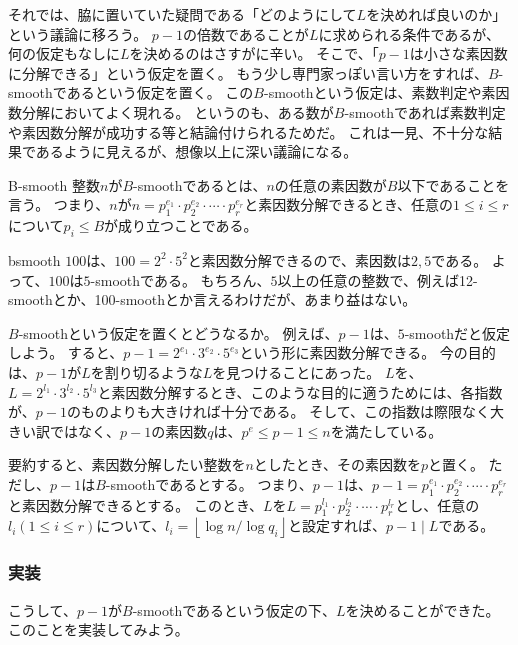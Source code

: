 それでは、脇に置いていた疑問である「どのようにして$L$を決めれば良いのか」という議論に移ろう。
$p-1$の倍数であることが$L$に求められる条件であるが、何の仮定もなしに$L$を決めるのはさすがに辛い。
そこで、「$p-1$は小さな素因数に分解できる」という仮定を置く。
もう少し専門家っぽい言い方をすれば、$B$-smoothであるという仮定を置く。
この$B$-smoothという仮定は、素数判定や素因数分解においてよく現れる。
というのも、ある数が$B$-smoothであれば素数判定や素因数分解が成功する等と結論付けられるためだ。
これは一見、不十分な結果であるように見えるが、想像以上に深い議論になる。

\begin{Defi}{}{B-smooth}
整数$n$が$B$-smoothであるとは、$n$の任意の素因数が$B$以下であることを言う。
つまり、$n$が$n=p_1^{e_1}\cdot p_2^{e_2}\cdot\cdots\cdot p_r^{e_r}$と素因数分解できるとき、任意の$1\le i\le r$について$p_i \le B$が成り立つことである。
\end{Defi}

\begin{Exam}{}{bsmooth}
$100$は、$100=2^2\cdot5^2$と素因数分解できるので、素因数は$2,5$である。
よって、$100$は$5$-smoothである。
もちろん、$5$以上の任意の整数で、例えば12-smoothとか、100-smoothとか言えるわけだが、あまり益はない。
\end{Exam}

$B$-smoothという仮定を置くとどうなるか。
例えば、$p-1$は、$5$-smoothだと仮定しよう。
すると、$p-1=2^{e_1}\cdot3^{e_2}\cdot5^{e_3}$という形に素因数分解できる。
今の目的は、$p-1$が$L$を割り切るような$L$を見つけることにあった。
$L$を、$L=2^{l_1}\cdot3^{l_2}\cdot5^{l_3}$と素因数分解するとき、このような目的に適うためには、各指数が、$p-1$のものよりも大きければ十分である。
そして、この指数は際限なく大きい訳ではなく、$p-1$の素因数$q$は、$p^e\le p-1\le n$を満たしている。

要約すると、素因数分解したい整数を$n$としたとき、その素因数を$p$と置く。
ただし、$p-1$は$B$-smoothであるとする。
つまり、$p-1$は、$p-1=p_1^{e_1}\cdot p_2^{e_2}\cdot\cdots\cdot p_r^{e_r}$と素因数分解できるとする。
このとき、$L$を$L=p_1^{l_1}\cdot p_2^{l_2}\cdot\cdots\cdot p_r^{l_r}$とし、任意の$l_i(1\le i\le r)$について、$l_i =\left \lfloor \log{n} / \log{q_i}\right \rfloor$と設定すれば、$p-1 \mid L$である。

\subsubsection{実装}
こうして、$p-1$が$B$-smoothであるという仮定の下、$L$を決めることができた。
このことを実装してみよう。

